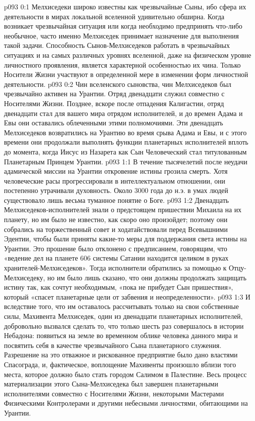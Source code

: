 \author{Мелхиседек}
\vs p093 0:1 Мелхиседеки широко известны как чрезвычайные Сыны, ибо сфера их деятельности в мирах локальной вселенной удивительно обширна. Когда возникает чрезвычайная ситуация или когда необходимо предпринять что\hyp{}либо необычное, часто именно Мелхиседек принимает назначение для выполнения такой задачи. Способность Сынов\hyp{}Мелхиседеков работать в чрезвычайных ситуациях и на самых различных уровнях вселенной, даже на физическом уровне личностного проявления, является характерной особенностью их чина. Только Носители Жизни участвуют в определенной мере в изменении форм личностной деятельности.
\vs p093 0:2 \pc Чин вселенского сыновства, чин Мелхиседеков был чрезвычайно активен на Урантии. Отряд двенадцати служил совместно с Носителями Жизни. Позднее, вскоре после отпадения Калигастии, отряд двенадцати стал для вашего мира отрядом исполнителей, и до времен Адама и Евы они оставались облеченными этими полномочиями. Эти двенадцать Мелхиседеков возвратились на Урантию во время срыва Адама и Евы, и с этого времени они продолжали выполнять функции планетарных исполнителей вплоть до момента, когда Иисус из Назарета как Сын Человеческий стал титулованным Планетарным Принцем Урантии.
\vs p093 1:1 В течение тысячелетий после неудачи адамической миссии на Урантии откровение истины грозила смерть. Хотя человеческие расы прогрессировали в интеллектуальном отношении, они постепенно утрачивали духовность. Около 3000 года до н.э. в умах людей существовало лишь весьма туманное понятие о Боге.
\vs p093 1:2 Двенадцать Мелхиседеков\hyp{}исполнителей знали о предстоящем пришествии Михаила на их планету, но им было не известно, как скоро оно произойдет; поэтому они собрались на торжественный совет и ходатайствовали перед Всевышними Эдентии, чтобы были приняты какие\hyp{}то меры для поддержания света истины на Урантии. Это прошение было отклонено с предписанием, говорящим, что «ведение дел на планете 606 системы Сатании находится целиком в руках хранителей\hyp{}Мелхиседеков». Тогда исполнители обратились за помощью к Отцу\hyp{}Мелхиседеку, но им было лишь сказано, что они должны продолжать защищать истину так, как сочтут необходимым, «пока не прибудет Сын пришествия», который «спасет планетарные цели от забвения и неопределенности».
\vs p093 1:3 И вследствие того, что им оставалось рассчитывать только на свои собственные силы, Махивента Мелхиседек, один из двенадцати планетарных исполнителей, добровольно вызвался сделать то, что только шесть раз совершалось в истории Небадона: появиться на земле во временном облике человека данного мира и посвятить себя в качестве чрезвычайного Сына планетарного служения. Разрешение на это отважное и рискованное предприятие было дано властями Спасограда, и, фактическое, воплощение Махивенты произошло вблизи того места, которое должно было стать городом Салимом в Палестине. Весь процесс материализации этого Сына\hyp{}Мелхиседека был завершен планетарными исполнителями совместно с Носителями Жизни, некоторыми Мастерами Физическими Контролерами и другими небесными личностями, обитающими на Урантии.
